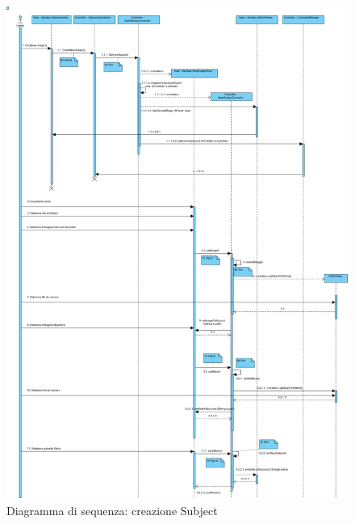 \pagebreak
\begin{figure}[!h]
\centering
			\includegraphics[width=1.12\linewidth]{./Content/Immagini/Creazione_subject.png}
			\caption{Diagramma di sequenza: creazione Subject}
			\label{creazione_subject_img}
\end{figure}
\pagebreak


